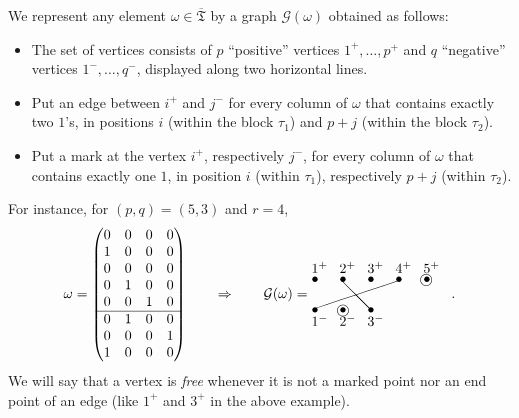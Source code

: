 \documentclass[11pt]{article}
\theoremstyle{definition}
\numberwithin{equation}{section}
\newcommand{\ppermutationsof}{\mathfrak{T}}
\newcommand{\parameters}{\overline{\ppermutationsof}}
\begin{document}
We represent any element $\omega\in\parameters$ by a graph $\mathcal{G}(\omega)$ obtained as follows:
\begin{itemize}
\item
The set of vertices consists of $p$ ``positive'' vertices $1^+,\ldots,p^+$ and $q$ ``negative'' vertices $1^-,\ldots,q^-$, displayed along two horizontal lines.
\item Put an edge between $i^+$ and $j^-$ for every column of $\omega$ that contains exactly two $1$'s, in positions $i$ (within the block $\tau_1$) and $p+j$ (within the block $\tau_2$).
\item
Put a mark at the vertex $i^+$, respectively $j^-$, for every column of $\omega$ that contains exactly one $1$, in position $i$ (within $\tau_1$), respectively $p+j$ (within $\tau_2$).
\end{itemize}
For instance, for $(p,q)=(5,3)$ and $r=4$,
\begin{equation}
\label{2.1}
\omega=\mbox{\tiny $\begin{pmatrix} 0 & 0 & 0 & 0\\ 1 & 0 & 0 & 0\\ 0 & 0 & 0 & 0\\ 0 & 1 & 0 & 0\\ 0 & 0 & 1 & 0\\ \hline 0 & 1 & 0 & 0\\ 0 & 0 & 0 & 1\\ 1 & 0 & 0 & 0 \end{pmatrix}$}
\qquad
\Rightarrow
\qquad
\mathcal{G}(\omega)=
\mbox{\tiny
$\begin{picture}(100,20)(0,0)
\put(0,11){$\bullet$}\put(20,11){$\bullet$}\put(40,11){$\bullet$}\put(60,11){$\bullet$}\put(80,11){$\bullet$}
\put(0,18){$1^+$}\put(20,18){$2^+$}\put(40,18){$3^+$}\put(60,18){$4^+$}\put(80,18){$5^+$}
\put(0,-11){$\bullet$}\put(20,-11){$\bullet$}\put(40,-11){$\bullet$}
\put(0,-20){$1^-$}\put(20,-20){$2^-$}\put(40,-20){$3^-$}
\put(21,13){\line(1,-1){21}}
\put(61,12){\line(-3,-1){60}}
\put(82,13){\circle{8}}
\put(22.5,-9){\circle{8}}
\end{picture}$}.
\end{equation}
We will say that a vertex is {\em free} whenever it is not a marked
point nor an end point of an edge (like $1^+$ and $3^+$ in the above
example).
\end{document}
